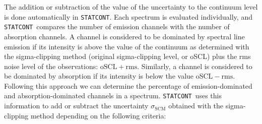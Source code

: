 \documentclass{aa}
\newcommand{\statcont} {\texttt{STATCONT}}
\begin{document}
The addition or subtraction of the value of the uncertainty to the continuum level is done automatically in \statcont. Each spectrum is evaluated individually, and \statcont\ compares the number of emission channels with the number of absorption channels. A channel is considered to be dominated by spectral line emission if its intensity is above the value of the continuum as determined with the sigma-clipping method (original sigma-clipping level, or oSCL) plus the rms noise level of the observations: $\mathrm{oSCL}+\mathrm{rms}$. Similarly, a channel is considered to be dominated by absorption if its intensity is below the value $\mathrm{oSCL}-\mathrm{rms}$. Following this approach we can determine the percentage of emission-dominated and absorption-dominated channels in a spectrum. \statcont\ uses this information to add or subtract the uncertainty $\sigma_\mathrm{SCM}$ obtained with the sigma-clipping method depending on the following criteria:
\end{document}
